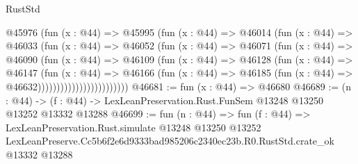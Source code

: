 \begin{lexlean}{RustStd}
\begin{coremodule}
                          @45976
                            (fun (x : @44) =>
                            @45995
                              (fun (x : @44) =>
                              @46014
                                (fun (x : @44) =>
                                @46033
                                  (fun (x : @44) =>
                                  @46052
                                    (fun (x : @44) =>
                                    @46071
                                      (fun (x : @44) =>
                                      @46090
                                        (fun (x : @44) =>
                                        @46109
                                          (fun (x : @44) =>
                                          @46128
                                            (fun (x : @44) =>
                                            @46147
                                              (fun (x : @44) =>
                                              @46166
                                                (fun (x : @44) =>
                                                @46185
                                                  (fun (x : @44) => @46632))))))))))))))))))))))))
@46681 := fun (x : @44) => @46680
@46689 := (n : @44) ->
  (f : @44) -> LexLeanPreservation.Rust.FunSem @13248 @13250 @13252 @13332 @13288
@46699 := fun (n : @44) =>
  fun (f : @44) =>
  LexLeanPreservation.Rust.simulate
    @13248
    @13250
    @13252
    LexLeanPreserve.Cc5b6f2e6d9333bad985206c2340ec23b.R0.RustStd.crate_ok
    @13332
    @13288
\end{coremodule}
\end{lexlean}
